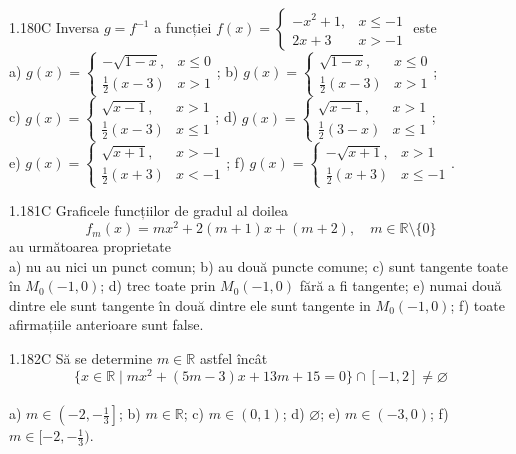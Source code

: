 \documentclass[11pt]{article}
\begin{document}
1.180C Inversa $g=f^{-1}$ a funcției $f(x)=\left\{\begin{array}{ll}-x^{2}+1, & x \leq-1 \\ 2 x+3 & x>-1\end{array}\right.$ este\\ a) $g(x)=\left\{\begin{array}{cl}-\sqrt{1-x}, & x \leq 0 \\ \frac{1}{2}(x-3) & x>1\end{array}\right.$; b) $g(x)= \begin{cases}\sqrt{1-x}, & x \leq 0 \\ \frac{1}{2}(x-3) & x>1\end{cases}$;\\ c) $g(x)=\left\{\begin{array}{ll}\sqrt{x-1}, & x>1 \\ \frac{1}{2}(x-3) & x \leq 1\end{array}\right.$; d) $g(x)=\left\{\begin{array}{ll} \sqrt{x-1}, & x>1 \\ \frac{1}{2}(3-x) & x \leq 1\end{array}\right.$;\\ e) $g(x)=\left\{\begin{array}{ll}\sqrt{x+1}, & x>-1 \\ \frac{1}{2}(x+3) & x<-1\end{array}\right.$; f) $g(x)=\left\{\begin{array}{cl}-\sqrt{x+1}, & x>1 \\ \frac{1}{2}(x+3) & x \leq-1\end{array}\right.$.

1.181C Graficele funcțiilor de gradul al doilea $$f_{m}(x)=m x^{2}+2(m+1) x+(m+2), \quad m \in \mathbb{R} \setminus\{0\}$$ au următoarea proprietate\\ a) nu au nici un punct comun; b) au două puncte comune; c) sunt tangente toate în $M_{0}(-1,0)$; d) trec toate prin $M_{0}(-1,0)$ fără a fi tangente; e) numai două dintre ele sunt tangente în două dintre ele sunt tangente in $M_{0}(-1,0)$; f) toate afirmațiile anterioare sunt false.

1.182C Să se determine $m \in \mathbb{R}$ astfel încât $$\{x \in \mathbb{R} \mid mx^{2}+(5 m-3) x+13 m+15=0\} \cap[-1,2] \neq \varnothing$$\\ a) $m \in\left(-2,-\frac{1}{3}\right]$; b) $m \in \mathbb{R}$; c) $m \in(0,1)$; d) $\varnothing$; e) $m \in(-3,0)$; f) $m \in [-2,-\frac{1}{3})$.
\end{document}
